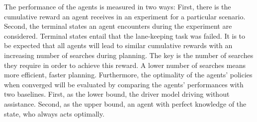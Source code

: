 The performance of the agents is measured in two ways: First, there is the cumulative reward an agent receives in an experiment for a particular scenario. Second, the terminal states an agent encounters during the experiment are considered. Terminal states entail that the lane-keeping task was failed. It is to be expected that all agents will lead to similar cumulative rewards with an increasing number of searches during planning. The key is the number of searches they require in order to achieve this reward. A lower number of searches means more efficient, faster planning. Furthermore, the optimality of the agents' policies when converged will be evaluated by comparing the agents' performances with two baselines. First, as the lower bound, the driver model driving without assistance. Second, as the upper bound, an agent with perfect knowledge of the state, who always acts optimally.
